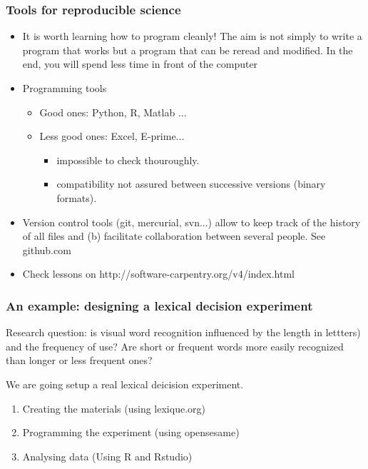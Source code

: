 \documentclass{beamer}
\begin{document}
\begin{frame}
\frametitle{Tools for reproducible science}

\begin{itemize}
  \item It is worth learning how to program cleanly! The aim is not simply to write a program that works but a program that can be reread and modified. In the end, you will spend less time in front of the computer

\pause

  \item Programming tools

    \begin{itemize}
    \item Good ones: Python, R, Matlab ...

    \item Less good ones: Excel, E-prime...

      \begin{itemize}
      \item impossible to check thouroughly.
      \item compatibility not assured between successive versions (binary formats).
        
      \end{itemize}
    \end{itemize}

\pause

  \item Version control tools (git, mercurial, svn...) allow to 
    keep track of the history of all files and (b) facilitate collaboration between several people. See github.com
  
\pause
\item Check lessons on http://software-carpentry.org/v4/index.html


\end{itemize}



\end{frame}


\begin{frame}[fragile]
\frametitle{An example: designing a lexical decision experiment}

Research question: is visual word recognition influenced by the length in lettters) and the frequency of use? Are short or frequent words more easily recognized than longer or less frequent ones?

We are going setup a real lexical deicision experiment.

\begin{enumerate}
\item Creating the materials (using lexique.org)

\item Programming the experiment (using opensesame)

\item Analysing data (Using R and Rstudio)
\end{enumerate}

\end{frame}
\end{document}
